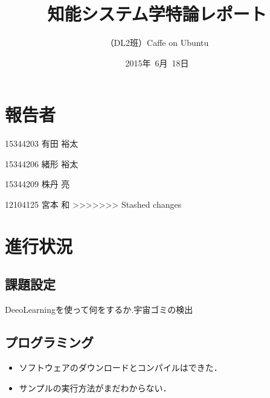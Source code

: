 \documentclass[a4paper,10pt]{jsarticle}
\title{知能システム学特論レポート}
\author{
（DL2班）Caffe on Ubuntu\\
}
\date{2015年\ 6月\ 18日}
\begin{document}
\section{報告者}
\begin{list}{}{}
 \item 15344203\hspace{0.5cm} 有田 裕太
 \item 15344206\hspace{0.5cm} 緒形 裕太
 \item 15344209\hspace{0.5cm} 株丹 亮
 \item 12104125\hspace{0.5cm} 宮本 和
>>>>>>> Stashed changes
\end{list}

\section{進行状況}
\subsection{課題設定}
DeeoLearningを使って何をするか.宇宙ゴミの検出

\subsection{プログラミング}
\begin{itemize}
 \item ソフトウェアのダウンロードとコンパイルはできた．
 \item サンプルの実行方法がまだわからない．
\end{itemize}
\end{document}
